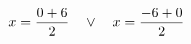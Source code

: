 \documentclass[preview]{standalone}
\begin{document}
\begin{align*}
\special{dvisvgm:raw <g id='unique000'>}x=\frac{0 + 6}{2} \quad \lor \quad x=\frac{-6 + 0}{2}\special{dvisvgm:raw </g>}
\end{align*}
\end{document}

